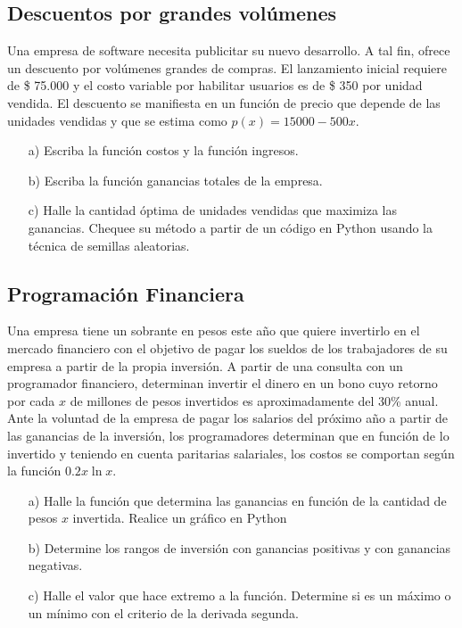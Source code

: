\documentclass[12pt]{article}
\begin{document}
\subsection{Descuentos por grandes volúmenes }

Una empresa de software necesita publicitar su nuevo desarrollo. A tal fin, ofrece un descuento por volúmenes grandes de compras. El lanzamiento inicial requiere de \$ 75.000 y el costo variable por habilitar usuarios es de \$ 350 por unidad vendida. El descuento se manifiesta en un función de precio que depende de las unidades vendidas y que se estima como $p(x) = 15000 - 500x$.
\begin{itemize}
    \item[a)] Escriba la función costos y la función ingresos.
    \item[b)] Escriba la función ganancias totales de la empresa.
    \item[c)] Halle la cantidad óptima de unidades vendidas que maximiza las ganancias. Chequee su método a partir de un código en Python usando la técnica de semillas aleatorias.
\end{itemize}

\subsection{Programación Financiera}

Una empresa tiene un sobrante en pesos este año que quiere invertirlo en el mercado financiero con el objetivo de pagar los sueldos de los trabajadores de su empresa a partir de la propia inversión. A partir de una consulta con un programador financiero, determinan invertir el dinero en un bono cuyo retorno por cada $x$ de millones de pesos invertidos es aproximadamente del 30\% anual. Ante la voluntad de la empresa de pagar los salarios del próximo año a partir de las ganancias de la inversión, los programadores determinan que en función de lo invertido y teniendo en cuenta paritarias salariales, los costos se comportan según la función $0.2 x \ln x$. 
\begin{itemize}
    \item[a)] Halle la función que determina las ganancias en función de la cantidad de pesos $x$ invertida. Realice un gráfico en Python
    \item[b)] Determine los rangos de inversión con ganancias positivas y con ganancias negativas.
    \item[c)] Halle el valor que hace extremo a la función. Determine si es un máximo o un mínimo con el criterio de la derivada segunda.
\end{itemize}
\end{document}
